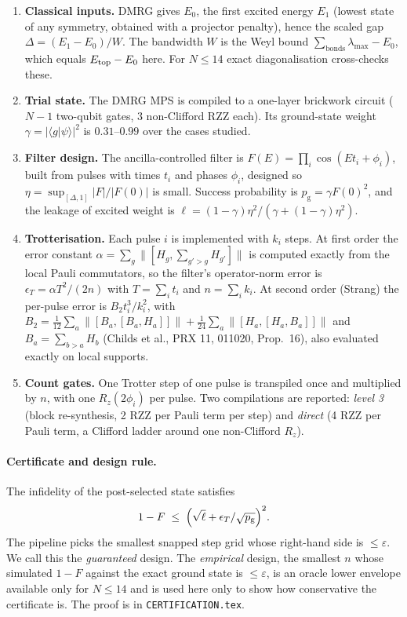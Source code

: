 \documentclass[11pt]{article}
\newcommand{\eps}{\varepsilon}
\newcommand{\pg}{p_{\mathrm g}}
\begin{document}
\begin{enumerate}
\item \textbf{Classical inputs.} DMRG gives $E_0$, the first excited energy $E_1$ (lowest state of any symmetry,
 obtained with a projector penalty), hence the scaled gap $\Delta=(E_1-E_0)/W$. The bandwidth $W$ is the Weyl bound
 $\sum_{\text{bonds}}\lambda_{\max}-E_0$, which equals $E_{\rm top}-E_0$ here. For $N\le14$ exact diagonalisation
 cross-checks these.
\item \textbf{Trial state.} The DMRG MPS is compiled to a one-layer brickwork circuit ($N-1$ two-qubit gates,
 3 non-Clifford RZZ each). Its ground-state weight $\gamma=|\langle g|\psi\rangle|^2$ is $0.31$--$0.99$ over the cases
 studied.
\item \textbf{Filter design.} The ancilla-controlled filter is $F(E)=\prod_i\cos(Et_i+\phi_i)$, built from pulses with
 times $t_i$ and phases $\phi_i$, designed so $\eta=\sup_{[\Delta,1]}|F|/|F(0)|$ is small. Success probability is
 $\pg=\gamma F(0)^2$, and the leakage of excited weight is
 $\ell=(1-\gamma)\eta^2/(\gamma+(1-\gamma)\eta^2)$.
\item \textbf{Trotterisation.} Each pulse $i$ is implemented with $k_i$ steps. At first order the error
 constant $\alpha=\sum_g\|[H_g,\sum_{g'>g}H_{g'}]\|$ is computed exactly from the local Pauli commutators, so the
 filter's operator-norm error is $\epsilon_T=\alpha T^2/(2n)$ with $T=\sum_i t_i$ and $n=\sum_i k_i$. At second
 order (Strang) the per-pulse error is $B_2t_i^3/k_i^2$, with
 $B_2=\tfrac1{12}\sum_a\|[B_a,[B_a,H_a]]\|+\tfrac1{24}\sum_a\|[H_a,[H_a,B_a]]\|$ and $B_a=\sum_{b>a}H_b$
 (Childs et al., PRX 11, 011020, Prop.~16), also evaluated exactly on local supports.
\item \textbf{Count gates.} One Trotter step of one pulse is transpiled once and multiplied by $n$, with one
 $R_z(2\phi_i)$ per pulse. Two compilations are reported: \emph{level 3} (block re-synthesis, 2 RZZ per Pauli term
 per step) and \emph{direct} (4 RZZ per Pauli term, a Clifford ladder around one non-Clifford $R_z$).
\end{enumerate}

\paragraph{Certificate and design rule.} The infidelity of the post-selected state satisfies
\begin{equation}
 1-F\;\le\;\Bigl(\sqrt{\ell}+\epsilon_T/\sqrt{\pg}\Bigr)^2 .
\end{equation}
The pipeline picks the smallest snapped step grid whose right-hand side is $\le\eps$. We call this the
\emph{guaranteed} design. The \emph{empirical} design, the smallest $n$ whose simulated $1-F$ against the exact ground
state is $\le\eps$, is an oracle lower envelope available only for $N\le14$ and is used here only to show how
conservative the certificate is. The proof is in \texttt{CERTIFICATION.tex}.
\end{document}
